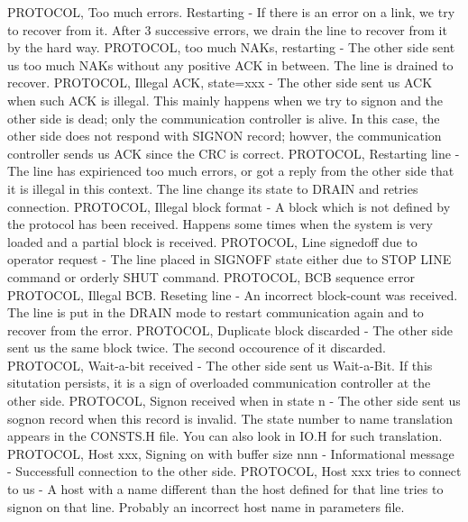 \hfill\break
{\ncrBold PROTOCOL, Too much errors. Restarting }
- If there is an error on a  link,
we  try to recover from it. After 3 successive errors, we drain the line
to recover from it by the hard way.
\hfill\break
{\ncrBold PROTOCOL, too much NAKs, restarting }
- The other side sent  us  too  much
NAKs  without  any  positive  ACK  in  between.  The  line is drained to
recover.
\hfill\break
{\ncrBold PROTOCOL, Illegal ACK, state=xxx }
- The other side sent us ACK when  such
ACK  is illegal. This mainly happens when we try to signon and the other
side is dead; only the communication controller is alive. In this  case,
the  other  side  does  not  respond  with  SIGNON  record;  howver, the
communication controller sends us ACK since the CRC is correct.
\hfill\break
{\ncrBold PROTOCOL, Restarting line }
- The line has expirienced too much errors, or
got  a reply from the other side that it is illegal in this context. The
line change its state to DRAIN and retries connection.
\hfill\break
{\ncrBold PROTOCOL, Illegal block format }
- A block which is  not  defined  by  the
protocol  has  been received. Happens some times when the system is very
loaded and a partial block is received.
\hfill\break
{\ncrBold PROTOCOL, Line signedoff due to operator request }
- The  line  placed  in
SIGNOFF state either due to STOP LINE command or orderly SHUT command.
\hfill\break
{\ncrBold PROTOCOL, BCB sequence error}
\hfill\break
{\ncrBold PROTOCOL,  Illegal  BCB.  Reseting  line }
- An incorrect block-count was
received. The line is put in the DRAIN  mode  to  restart  communication
again and to recover from the error.
\hfill\break
{\ncrBold PROTOCOL,  Duplicate  block  discarded }
- The other side sent us the same
block twice. The second occourence of it discarded.
\hfill\break
{\ncrBold PROTOCOL, Wait-a-bit received}
- The other side sent  us  Wait-a-Bit.  If
this  situtation  persists,  it  is  a  sign of overloaded communication
controller at the other side.
\hfill\break
{\ncrBold PROTOCOL, Signon received when in state n }
-  The  other  side  sent  us
sognon  record  when  this  record  is invalid. The state number to name
translation appears in the CONSTS.H file. You can also look in IO.H  for
such translation.
\hfill\break
{\ncrBold PROTOCOL,  Host  xxx,  Signing  on  with buffer size nnn }
- Informational
message - Successfull connection to the other side.
\hfill\break
{\ncrBold PROTOCOL, Host xxx tries to connect to us }
- A host with a name different
than  the  host  defined  for  that  line  tries to signon on that line.
Probably an incorrect host name in parameters file.
